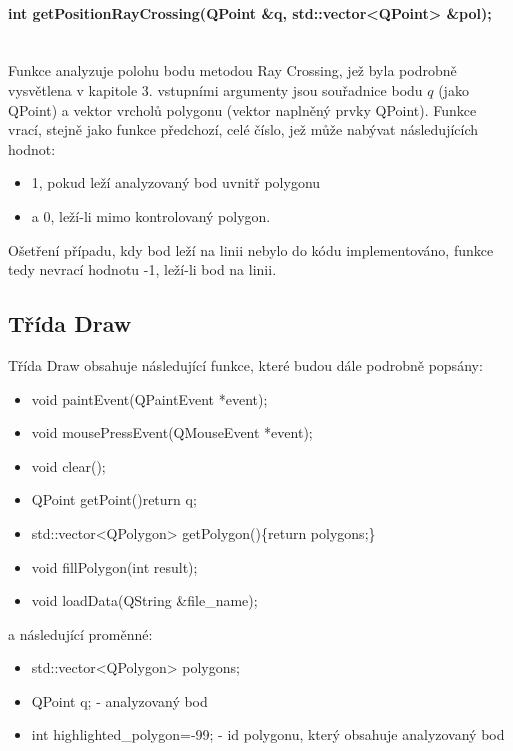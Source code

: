 \documentclass[11pt]{article}
\begin{document}
\paragraph{int getPositionRayCrossing(QPoint \&q, std::vector<QPoint> \&pol);}\mbox{}\\
Funkce analyzuje polohu bodu metodou Ray Crossing, jež byla podrobně vysvětlena v kapitole 3. vstupními argumenty jsou souřadnice bodu $q$ (jako QPoint) a vektor vrcholů polygonu (vektor naplněný prvky QPoint). Funkce vrací, stejně jako funkce předchozí, celé číslo, jež může nabývat následujících hodnot:

\begin{itemize}
\item 1, pokud leží analyzovaný bod uvnitř polygonu
\item a 0, leží-li mimo kontrolovaný polygon.
\end{itemize}

Ošetření případu, kdy bod leží na linii nebylo do kódu implementováno, funkce tedy nevrací  hodnotu -1, leží-li bod na linii.

\subsection{Třída Draw}
Třída Draw obsahuje následující funkce, které budou dále podrobně popsány:

\begin{itemize}
\item void paintEvent(QPaintEvent *event);
\item void mousePressEvent(QMouseEvent *event);
\item void clear();
\item QPoint getPoint(){return q;}
\item std::vector<QPolygon> getPolygon()\{return polygons;\}
\item void fillPolygon(int result);
\item void loadData(QString \&file\_name);
\end{itemize}

a následující proměnné:

\begin{itemize}
\item std::vector<QPolygon> polygons;  
\item QPoint q; - analyzovaný bod
\item int highlighted\_polygon=-99; - id polygonu, který obsahuje analyzovaný bod   
\end{itemize}
\end{document}
